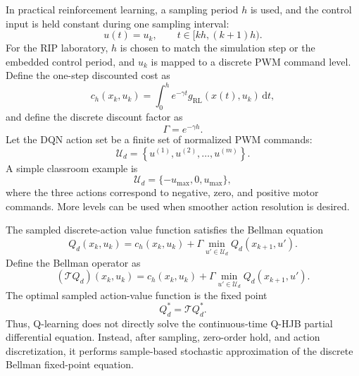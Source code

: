 \documentclass[11pt]{article}
\begin{document}
In practical reinforcement learning, a sampling period $h$ is used, and the control input is held constant during one sampling interval:
\begin{equation}
u(t)=u_k,
\qquad t\in[kh,(k+1)h).
\label{eq:zoh_action}
\end{equation}
For the RIP laboratory, $h$ is chosen to match the simulation step or the embedded control period, and $u_k$ is mapped to a discrete PWM command level. Define the one-step discounted cost as
\begin{equation}
c_h(x_k,u_k)
=
\int_0^h e^{-\gamma t}g_{\mathrm{RL}}(x(t),u_k)\,\mathrm{d}t,
\label{eq:one_step_cost}
\end{equation}
and define the discrete discount factor as
\begin{equation}
\Gamma=e^{-\gamma h}.
\label{eq:discrete_discount}
\end{equation}
Let the DQN action set be a finite set of normalized PWM commands:
\begin{equation}
\mathcal{U}_d
=\left\{u^{(1)},u^{(2)},\ldots,u^{(m)}\right\}.
\label{eq:DQN_action_set}
\end{equation}
A simple classroom example is
\begin{equation}
\mathcal{U}_d=\{-u_{\max},0,u_{\max}\},
\label{eq:DQN_action_example}
\end{equation}
where the three actions correspond to negative, zero, and positive motor commands. More levels can be used when smoother action resolution is desired.

The sampled discrete-action value function satisfies the Bellman equation
\begin{equation}
Q_d(x_k,u_k)
=c_h(x_k,u_k)
+\Gamma\min_{u'\in\mathcal{U}_d}Q_d(x_{k+1},u').
\label{eq:sampled_bellman_Q}
\end{equation}
Define the Bellman operator as
\begin{equation}
(\mathcal{T}Q_d)(x_k,u_k)
=c_h(x_k,u_k)
+\Gamma\min_{u'\in\mathcal{U}_d}Q_d(x_{k+1},u').
\label{eq:Bellman_operator}
\end{equation}
The optimal sampled action-value function is the fixed point
\begin{equation}
Q_d^{*}=\mathcal{T}Q_d^{*}.
\label{eq:Bellman_fixed_point}
\end{equation}
Thus, Q-learning does not directly solve the continuous-time Q-HJB partial differential equation. Instead, after sampling, zero-order hold, and action discretization, it performs sample-based stochastic approximation of the discrete Bellman fixed-point equation.
\end{document}
